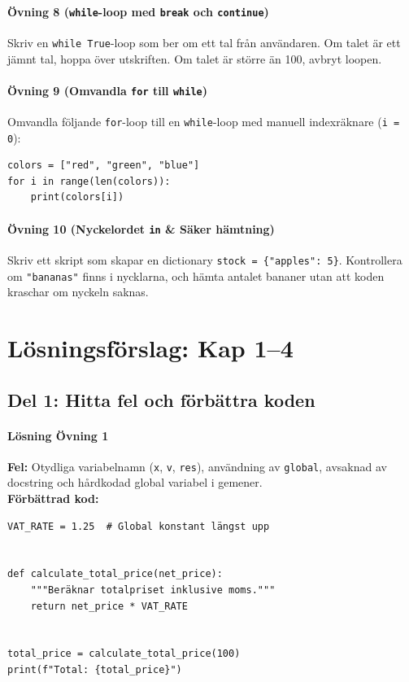 \documentclass{article}
\begin{document}
\paragraph{Övning 8 (\texttt{while}-loop med \texttt{break} och \texttt{continue})}
Skriv en \texttt{while True}-loop som ber om ett tal från användaren. Om talet är ett jämnt tal, hoppa över utskriften. Om talet är större än 100, avbryt loopen.

\paragraph{Övning 9 (Omvandla \texttt{for} till \texttt{while})}
Omvandla följande \texttt{for}-loop till en \texttt{while}-loop med manuell indexräknare (\texttt{i = 0}):
\begin{lstlisting}
colors = ["red", "green", "blue"]
for i in range(len(colors)):
    print(colors[i])
\end{lstlisting}

\paragraph{Övning 10 (Nyckelordet \texttt{in} \& Säker hämtning)}
Skriv ett skript som skapar en dictionary \texttt{stock = \{"apples": 5\}}. Kontrollera om \texttt{"bananas"} finns i nycklarna, och hämta antalet bananer utan att koden kraschar om nyckeln saknas.

\section*{Lösningsförslag: Kap 1--4}

\subsection*{Del 1: Hitta fel och förbättra koden}

\paragraph{Lösning Övning 1}
\textbf{Fel:} Otydliga variabelnamn (\texttt{x}, \texttt{v}, \texttt{res}), användning av \texttt{global}, avsaknad av docstring och hårdkodad global variabel i gemener. \\
\textbf{Förbättrad kod:}
\begin{lstlisting}
VAT_RATE = 1.25  # Global konstant längst upp


def calculate_total_price(net_price):
    """Beräknar totalpriset inklusive moms."""
    return net_price * VAT_RATE


total_price = calculate_total_price(100)
print(f"Total: {total_price}")
\end{lstlisting}
\end{document}
